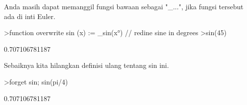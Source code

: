 \begin{eulernotebook}
\begin{eulercomment}
\begin{eulercomment}
\begin{eulercomment}
Anda masih dapat memanggil fungsi bawaan sebagai "\_...", jika fungsi
tersebut ada di inti Euler.
\end{eulercomment}
\begin{eulerprompt}
>function overwrite sin (x) := _sin(x°) // redine sine in degrees
>sin(45)
\end{eulerprompt}
\begin{euleroutput}
  0.707106781187
\end{euleroutput}
\begin{eulercomment}
Sebaiknya kita hilangkan definisi ulang tentang sin ini.
\end{eulercomment}
\begin{eulerprompt}
>forget sin; sin(pi/4)
\end{eulerprompt}
\begin{euleroutput}
  0.707106781187\\
  

\end{euleroutput}
\end{eulercomment}
\end{eulercomment}
\end{eulernotebook}
